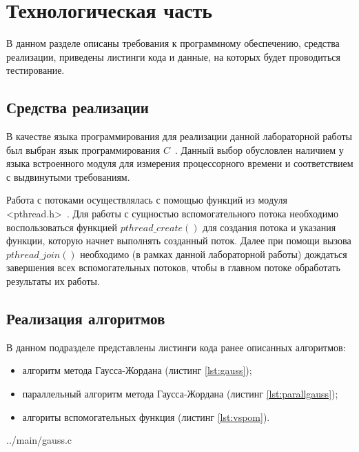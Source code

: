 \chapter{Технологическая часть}

В данном разделе описаны требования к программному обеспечению, средства
реализации, приведены листинги кода и данные, на которых будет проводиться
тестирование.

\section{Средства реализации}

В качестве языка программирования для реализации данной лабораторной работы 
был выбран язык программирования $C$~\cite{c}. Данный выбор обусловлен наличием у языка 
встроенного модуля для измерения процессорного времени и соответствием с 
выдвинутыми требованиям.

Работа с потоками осуществлялась с помощью функций из модуля <pthread.h>~\cite{pth}. 
Для работы с сущностью вспомогательного потока необходимо воспользоваться 
функцией $pthread\_create()$ для создания потока и указания функции, которую 
начнет выполнять созданный поток. Далее при помощи вызова $pthread\_join()$ 
необходимо (в рамках данной лабораторной работы) дождаться завершения всех
вспомогательных потоков, чтобы в главном потоке обработать результаты их работы.

\clearpage
\section{Реализация алгоритмов}
В данном подразделе представлены листинги кода ранее описанных алгоритмов:
\begin{itemize}[left=\parindent]
    \item алгоритм метода Гаусса-Жордана (листинг \ref{lst:gauss});
    \item параллельный алгоритм метода Гаусса-Жордана (листинг \ref{lst:parallgauss});
    \item алгориты вспомогательных функция (листинг \ref{lst:vspom}).
\end{itemize}

\noindent
\begin{minipage}{\linewidth}
\begin{lstinputlisting}[
	caption={Реализация алгоритма метода Гаусса-Жордана.},
	label={lst:gauss},
	linerange={25-49}
]{../main/gauss.c}
\end{lstinputlisting}
\end{minipage}

